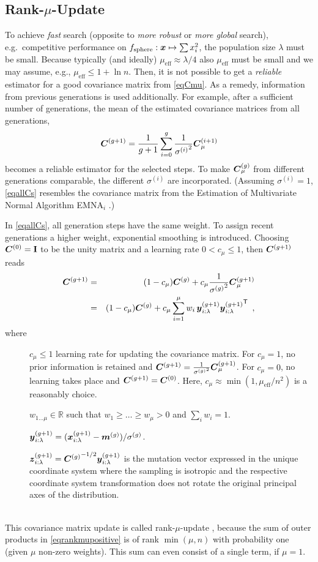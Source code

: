 \documentclass{article} %
\newcommand{\R}{\mathbb{R}}
\newcommand{\kom}[1]{}
\newcommand{\where}[1]{%
  \begin{description}
  \item[]#1 \vspace{-0.9ex}
  \end{description}
}
\newcommand{\whereende}{\vspace{2ex}~\\}
\newcommand{\ve}[1]{\mathchoice{\mbox{\boldmath$\displaystyle#1$}}
  {\mbox{\boldmath$\textstyle#1$}} {\mbox{\boldmath$\scriptstyle#1$}}
  {\mbox{\boldmath$\scriptscriptstyle#1$}}}
\newcommand{\ma}[1]{\mathchoice{\mbox{\boldmath$\displaystyle#1$}}
  {\mbox{\boldmath$\textstyle#1$}} {\mbox{\boldmath$\scriptstyle#1$}}
  {\mbox{\boldmath$\scriptscriptstyle#1$}}}
\newcommand{\T}{\ensuremath{\mathsf{T}}}
\newcommand{\fsphere}{f_{\mathrm{sphere}}}
\newcommand{\N}{\ensuremath{n}}
\newcommand{\mueff}{\ensuremath{\mu_\mathrm{eff}}}
\newcommand{\summ}[2]{\sum_{#1=1}^{#2}}
\newcommand{\lam}{\ensuremath{\lambda}}
\newcommand{\sig}{\ensuremath{\sigma}}
\newcommand{\sigg}{\sigma^{(g)}}
\newcommand{\Cg}{\ensuremath{\ma{C}^{(g)}}}
\newcommand{\Cgg}{\ma{C}^{(g+1)}}
\newcommand{\xgg}{\ve{x}^{(g+1)}}
\newcommand{\x}{\ve{x}}
\newcommand{\y}{\ve{y}}
\newcommand{\z}{\ve{z}}
\newcommand{\ygg}{\y^{(g+1)}}
\newcommand{\zgg}{\z^{(g+1)}}
\newcommand{\ilam}{{i:\lam}}
\newcommand{\Id}{\mathbf{I}}
\newcommand{\cmu}{\ensuremath{c_\mu}}
\renewcommand{\whereende}{\vspace{1ex}~\\}
\newcommand{\xmean}{\ensuremath{\ve{m}}}
\newcommand{\xmeang}{\ensuremath{\xmean^{(g)}}}
\begin{document}
\subsection{Rank-$\mu$-Update\label{sec:updateC}}
To achieve \emph{fast} search (opposite to  \emph{more robust} or
\emph{more global} search), e.g.\ competitive performance on $\fsphere:\x\mapsto\sum x_i^2$,
the population size $\lam$ must be small\kom{ (e.g.\
$\lam\le5+2\,\ln\N$)}. Because typically (and ideally) $\mueff\approx\lam/4$ also $\mueff$
must be small and we may assume, e.g., $\mueff\le 1+\ln\N$. Then, it
is not possible to get a \emph{reliable} estimator for a good
covariance matrix from \eqref{eqCmu}.  As a remedy, information from
previous generations is used additionally.  For example, after a
sufficient number of generations, the mean of the estimated covariance
matrices from all generations,
\begin{equation}
  \Cgg =
  \frac{1}{g+1}\sum_{i=0}^{g}\frac{1}{{\sig^{(i)}}^2}\ma{C}^{(i+1)}_\mu
  \label{eqallCs} 
\end{equation}
becomes a reliable estimator for the selected steps. To make $\Cg_\mu$
from different generations comparable, the different $\sig^{(i)}$ are
incorporated.{ (Assuming $\sig^{(i)}=1$, \eqref{eqallCs} resembles the
  covariance matrix from the Estimation of Multivariate Normal Algorithm
  EMNA$_i$ \cite{Larranaga:2001}.)}

In \eqref{eqallCs}, all generation steps have the same weight. To
assign recent generations a higher weight, exponential smoothing is
introduced. Choosing $\ma{C}^{(0)}=\Id$ to be the unity matrix and a
learning rate $0<\cmu\le1$, then $\Cgg$ reads
\begin{eqnarray}
  \Cgg &=& (1-\cmu)\Cg + \cmu\frac{1}{{\sigg}^2}\Cgg_\mu \nonumber\\
       &=& (1-\cmu)\Cg + \cmu\summ{i}{\mu}w_i
            \,\ygg_\ilam {\ygg_\ilam}^\T \label{eqrankmupositive}
            \enspace,
\end{eqnarray}
where 
%
\where{$\cmu\le 1$ learning rate for updating the covariance
  matrix. For $\cmu=1$, no prior information is retained and
  $\Cgg=\frac{1}{{\sigg}^2}\Cgg_\mu$. For $\cmu=0$, no learning takes
  place and $\Cgg=\ma{C}^{(0)}$. Here, $\cmu\approx\min(1,\mueff/\N^2)$
  is a reasonably choice.
}
%
\where{$w_{1\dots\mu}\in\R$ such that $w_1\ge\dots\ge w_\mu> 0$ and $\sum_i w_i = 1$.} 
%
\where{$\ygg_\ilam = {(\xgg_{i:\lam} - \xmeang)}/{\sigg}$. }
%
\where{$\zgg_\ilam = {\Cg}^{-1/2} \ygg_\ilam$ is the mutation vector expressed in the unique coordinate system where the sampling is isotropic and the respective coordinate system transformation does not rotate the original principal axes of the distribution.}
\whereende
%
This covariance matrix update is called rank-$\mu$-update
\cite{Hansen:2003}, because the sum of outer products in
\eqref{eqrankmupositive} is of rank $\min(\mu,\N)$ with probability one (given 
$\mu$ non-zero weights).
This sum can even consist of a single term, if $\mu=1$.
\end{document}
